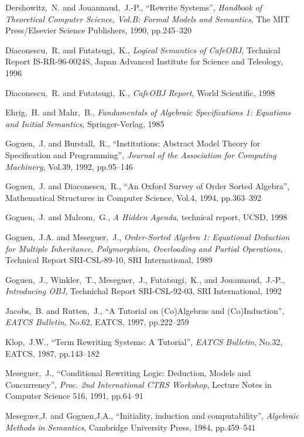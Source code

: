 \documentclass[a4paper]{memoir}
\begin{document}
\begin{thebibliography}{?-}

 Dershowitz,~N. and Jouannaud,~J.-P.,
  ``Rewrite Systems'',
  \textit{Handbook of Theoretical Computer Science, Vol.B: Formal Models
  and Semantics}, The MIT Press/Elsevier Science Publishers,
  1990, pp.245--320

 Diaconescu,~R. and Futatsugi,~K.,
  \textit{Logical Semantics of CafeOBJ}, Technical Report
  IS-RR-96-0024S, Japan Advanced Institute for Science and
  Teleology, 1996

 Diaconescu,~R. and Futatsugi,~K.,
  \textit{CafeOBJ Report}, World Scientific, 1998

 Ehrig,~H. and Mahr,~B.,
  \textit{Fundamentals of Algebraic Specifications 1:
       Equations and Initial Semantics},
  Springer-Verlag, 1985

 Goguen,~J. and Burstall,~R.,
  ``Institutions: Abstract Model Theory for Specification and Programming'',
  \textit{Journal of the Association for Computing Machinery},
  Vol.39, 1992, pp.95--146

 Goguen,~J. and Diaconescu,~R.,
  ``An Oxford Survey of Order Sorted Algebra'',
  Mathematical Structures in Computer Science, Vol.4, 1994,
  pp.363--392

 Goguen,~J. and Malcom,~G.,
  \textit{A Hidden Agenda}, technical report, UCSD, 1998

 Goguen,~J.A. and Meseguer,~J.,
 \textit{Order-Sorted Algebra 1:
  Equational Deduction for Multiple Inheritance, Polymorphism,
  Overloading and Partial Operations},
  Technical Report SRI-CSL-89-10, SRI International, 1989

 Goguen,~J., Winkler,~T., Meseguer,~J., Futatsugi,~K.,
  and Jouannaud,~J.-P.,
 \textit{Introducing OBJ}, Technichal Report
  SRI-CSL-92-03, SRI International, 1992

 Jacobs,~B. and Rutten,~J.,
  ``A Tutorial on (Co)Algebras and (Co)Induction'',
  \textit{EATCS Bulletin}, No.62, EATCS, 1997, pp.222--259

 Klop,~J.W.,
  ``Term Rewriting Systems: A Tutorial'',
  \textit{EATCS Bulletin}, No.32, EATCS, 1987, pp.143--182

 Meseguer,~J.,
  ``Conditional Rewriting Logic: Deduction, Models and Concurrency'',
  \textit{Proc. 2nd International CTRS Workshop}, Lecture Notes in
  Computer Science 516, 1991, pp.64--91

 Meseguer,J. and Goguen,J.A.,
  ``Initiality, induction and computability'',
  \textit{Algebraic Methods in Semantics},
  Cambridge University Press, 1984, pp.459--541

\end{thebibliography}
\clearpage
\twocolindex
\pagestyle{index}
\renewcommand{\preindexhook}{%
The first page number is usually, but not always, the primary reference to
the indexed topic.\vskip\onelineskip}
\indexintoc

\printindex

\onecolindex
\renewcommand*{\preindexhook}{}
\renewcommand*{\indexname}{Index of first lines}
\printindex[lines]

\cleardoublepage
\end{document}
